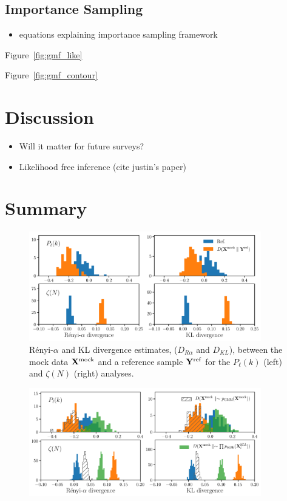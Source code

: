 \documentclass[12pt, letterpaper, preprint]{aastex}
\newcommand{\bitem}{\begin{itemize}}
\newcommand{\eitem}{\end{itemize}}
\begin{document}
\subsection{Importance Sampling} 
\bitem
    \item equations explaining importance sampling framework
\eitem
Figure~\ref{fig:gmf_like}


Figure~\ref{fig:gmf_contour}

\section{Discussion}
\bitem
    \item Will it matter for future surveys? 
    \item Likelihood free inference (cite justin's paper) 
\eitem

\section{Summary}

\begin{figure}
\begin{center}
\includegraphics[width=0.9\textwidth]{figs/kNNdiverg_Gauss.pdf}
\caption{R\'enyi-$\alpha$ and KL divergence estimates, ($D_{R\alpha}$ and $D_{KL}$), 
between the mock data ${\bf X}^\mathrm{mock}$ and a reference sample 
${\bf Y}^\mathrm{ref}$ for the $P_\ell(k)$ (left) and $\zeta(N)$ (right) analyses.}
\label{fig:div_gauss}
\end{center}
\end{figure}

\begin{figure}
\begin{center}
\includegraphics[width=0.9\textwidth]{figs/kNNdiverg_nonGauss.pdf}
\caption{}
\label{fig:div_nongauss}
\end{center}
\end{figure}
\end{document}
